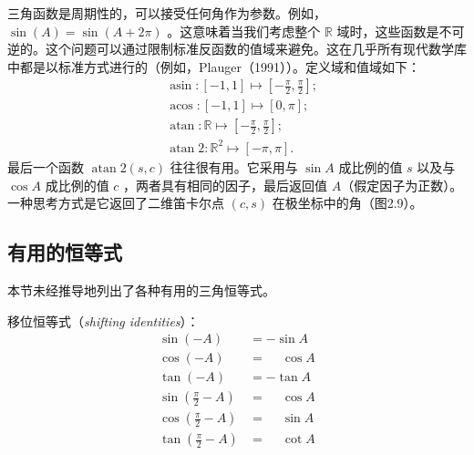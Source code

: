 \documentclass[lang=cn,12pt,marginpar=margintrue]{elegantbook}
\begin{document}

三角函数是周期性的，可以接受任何角作为参数。例如，$\sin(A) = \sin(A + 2\pi)$ 。这意味着当我们考虑整个 $\mathbb{R}$ 域时，这些函数是不可逆的。这个问题可以通过限制标准反函数的值域来避免。这在几乎所有现代数学库中都是以标准方式进行的（例如，Plauger（1991））。定义域和值域如下：
\begin{equation}
  \begin{aligned}
     & \operatorname{asin}:[-1,1] \mapsto[-\frac{\pi}{2}, \frac{\pi}{2}];      \\
     & \operatorname{acos}:[-1,1] \mapsto[0, \pi];                             \\
     & \operatorname{atan}: \mathbb{R} \mapsto[-\frac{\pi}{2}, \frac{\pi}{2}]; \\
     & \operatorname{atan} 2: \mathbb{R}^{2} \mapsto[-\pi, \pi].
  \end{aligned}
\end{equation}
最后一个函数 $\operatorname{atan}2(s,c)$ 往往很有用。它采用与 $\sin A$ 成比例的值 $s$ 以及与 $\cos A$ 成比例的值 $c$ ，两者具有相同的因子，最后返回值 $A$（假定因子为正数）。一种思考方式是它返回了二维笛卡尔点 $(c,s)$ 在极坐标中的角（图2.9）。


\subsection{有用的恒等式}

本节未经推导地列出了各种有用的三角恒等式。

移位恒等式（\textit{shifting identities}）：
\[
  \begin{aligned}
    \sin (-A)              & =-\sin A            \\
    \cos (-A)              & =\phantom{-} \cos A \\
    \tan (-A)              & =-\tan A            \\
    \sin (\frac{\pi}{2}-A) & =\phantom{-}\cos A  \\
    \cos (\frac{\pi}{2}-A) & =\phantom{-}\sin A  \\
    \tan (\frac{\pi}{2}-A) & =\phantom{-}\cot A
  \end{aligned}
\]
\end{document}
